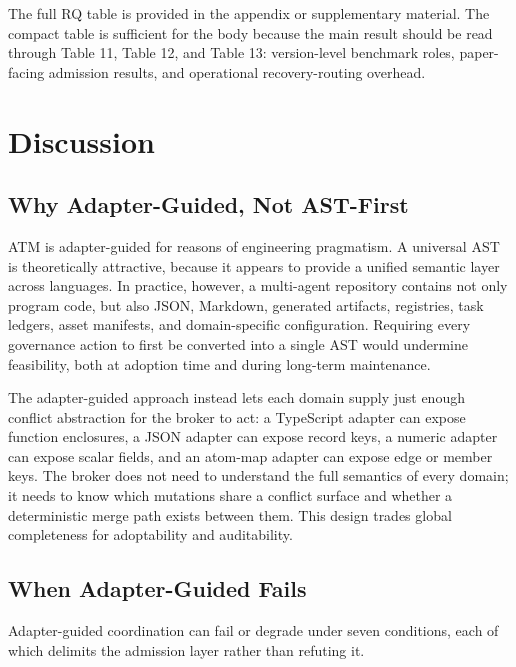 \documentclass[9pt,letterpaper]{extarticle}
\begin{document}
The full RQ table is provided in the appendix or supplementary material. The compact table is sufficient for the body because the main result should be read through Table 11, Table 12, and Table 13: version-level benchmark roles, paper-facing admission results, and operational recovery-routing overhead.

\section{Discussion}

\subsection{Why Adapter-Guided, Not AST-First}

ATM is adapter-guided for reasons of engineering pragmatism. A universal AST is theoretically attractive, because it appears to provide a unified semantic layer across languages. In practice, however, a multi-agent repository contains not only program code, but also JSON, Markdown, generated artifacts, registries, task ledgers, asset manifests, and domain-specific configuration. Requiring every governance action to first be converted into a single AST would undermine feasibility, both at adoption time and during long-term maintenance.

The adapter-guided approach instead lets each domain supply just enough conflict abstraction for the broker to act: a TypeScript adapter can expose function enclosures, a JSON adapter can expose record keys, a numeric adapter can expose scalar fields, and an atom-map adapter can expose edge or member keys. The broker does not need to understand the full semantics of every domain; it needs to know which mutations share a conflict surface and whether a deterministic merge path exists between them. This design trades global completeness for adoptability and auditability.

\subsection{When Adapter-Guided Fails}

Adapter-guided coordination can fail or degrade under seven conditions, each of which delimits the admission layer rather than refuting it.
\end{document}
